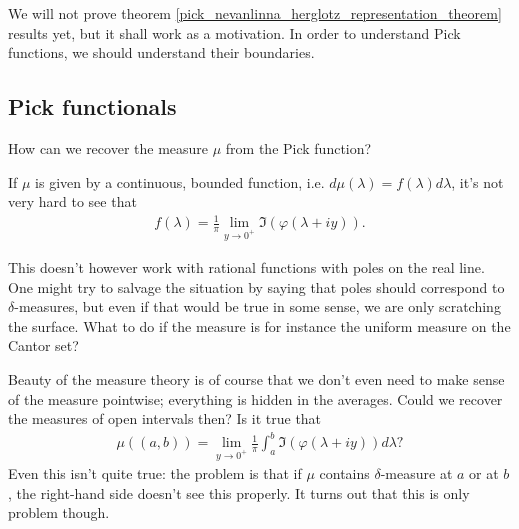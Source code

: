 We will not prove theorem \ref{pick_nevanlinna_herglotz_representation_theorem} results yet, but it shall work as a motivation. In order to understand Pick functions, we should understand their boundaries.

\subsection{Pick functionals}

\begin{quest}
	How can we recover the measure $\mu$ from the Pick function?
\end{quest}

If $\mu$ is given by a continuous, bounded function, i.e. $d \mu(\lambda) = f(\lambda) d \lambda$, it's not very hard to see that
\begin{align*}
	f(\lambda) = \frac{1}{\pi}\lim_{y \to 0^{+}} \Im(\varphi(\lambda + i y)).
\end{align*}

This doesn't however work with rational functions with poles on the real line. One might try to salvage the situation by saying that poles should correspond to $\delta$-measures, but even if that would be true in some sense, we are only scratching the surface. What to do if the measure is for instance the uniform measure on the Cantor set?

Beauty of the measure theory is of course that we don't even need to make sense of the measure pointwise; everything is hidden in the averages. Could we recover the measures of open intervals then? Is it true that
\begin{align*}
	\mu((a, b)) = \lim_{y \to 0^{+}}\frac{1}{\pi}\int_{a}^{b} \Im(\varphi(\lambda + i y)) d \lambda?
\end{align*}
Even this isn't quite true: the problem is that if $\mu$ contains $\delta$-measure at $a$ or at $b$, the right-hand side doesn't see this properly. It turns out that this is only problem though.

